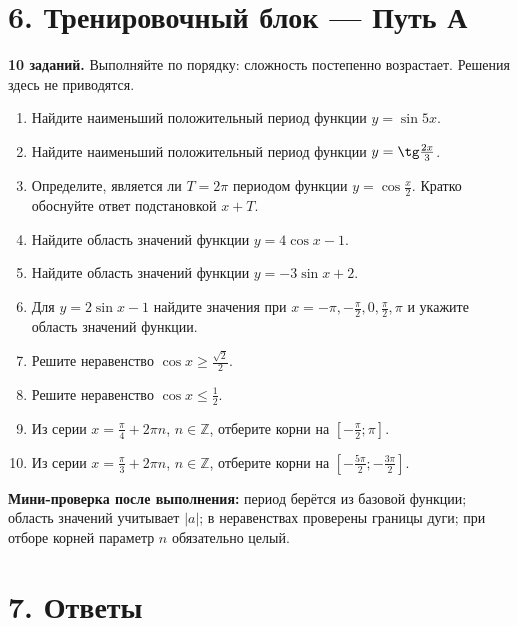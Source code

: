 \documentclass[a4paper,12pt]{article}
\newcommand{\sectionrule}{\par\vspace{-0.3em}{\color{accent}\rule{\linewidth}{0.7pt}}\vspace{0.6em}}
\begin{document}
\clearpage
\section*{6. Тренировочный блок --- Путь А}
\sectionrule

\textbf{10 заданий.} Выполняйте по порядку: сложность постепенно возрастает. Решения здесь не приводятся.

\begin{enumerate}[itemsep=4pt,topsep=4pt]
\item Найдите наименьший положительный период функции $y=\sin 5x$.
\item Найдите наименьший положительный период функции $y=\tg\frac{2x}{3}$.
\item Определите, является ли $T=2\pi$ периодом функции $y=\cos\frac{x}{2}$. Кратко обоснуйте ответ подстановкой $x+T$.
\item Найдите область значений функции $y=4\cos x-1$.
\item Найдите область значений функции $y=-3\sin x+2$.
\item Для $y=2\sin x-1$ найдите значения при $x=-\pi,-\frac\pi2,0,\frac\pi2,\pi$ и укажите область значений функции.
\item Решите неравенство $\displaystyle \cos x\ge\frac{\sqrt2}{2}$.
\item Решите неравенство $\displaystyle \cos x\le\frac12$.
\item Из серии $\displaystyle x=\frac\pi4+2\pi n$, $n\in\mathbb Z$, отберите корни на $\displaystyle \left[-\frac\pi2;\pi\right]$.
\item Из серии $\displaystyle x=\frac\pi3+2\pi n$, $n\in\mathbb Z$, отберите корни на $\displaystyle \left[-\frac{5\pi}{2};-\frac{3\pi}{2}\right]$.
\end{enumerate}

\vspace{5mm}
\textbf{Мини-проверка после выполнения:} период берётся из базовой функции; область значений учитывает $|a|$; в неравенствах проверены границы дуги; при отборе корней параметр $n$ обязательно целый.

\clearpage
\section*{7. Ответы}
\sectionrule
\end{document}
